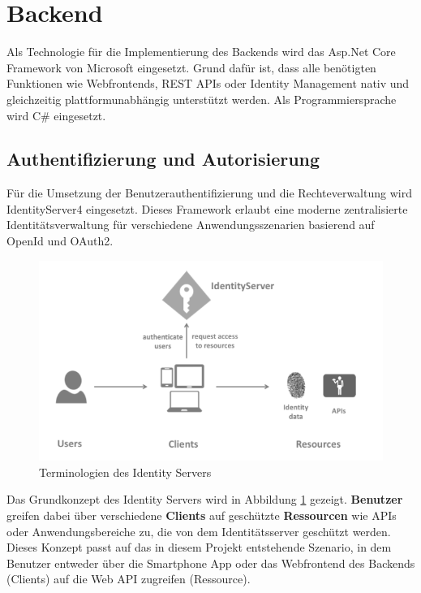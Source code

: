 \section{Backend}
Als Technologie für die Implementierung des Backends wird das Asp.Net Core Framework von Microsoft eingesetzt. Grund dafür ist, dass alle benötigten Funktionen wie Webfrontends, REST APIs oder Identity Management nativ und gleichzeitig plattformunabhängig unterstützt werden. Als Programmiersprache wird C\# eingesetzt.

\subsection{Authentifizierung und Autorisierung}
Für die Umsetzung der Benutzerauthentifizierung und die Rechteverwaltung wird IdentityServer4\cite{Allen2016} eingesetzt. Dieses Framework erlaubt eine moderne zentralisierte Identitätsverwaltung für verschiedene Anwendungsszenarien basierend auf OpenId und OAuth2. 

\begin{figure}[htp!]
  \begin{center}
    \includegraphics[width=\textwidth]{./img/BackendIdentityServer.png}
    \caption{Terminologien des Identity Servers}
    \label{fig:backendIdentityServer}
  \end{center}
\end{figure}

Das Grundkonzept des Identity Servers wird in Abbildung \ref{fig:backendIdentityServer} gezeigt. \textbf{Benutzer} greifen dabei über verschiedene \textbf{Clients} auf geschützte \textbf{Ressourcen} wie APIs oder Anwendungsbereiche zu, die von dem Identitätsserver geschützt werden. Dieses Konzept passt auf das in diesem Projekt entstehende Szenario, in dem Benutzer entweder über die Smartphone App oder das Webfrontend des Backends (Clients) auf die Web API zugreifen (Ressource).

